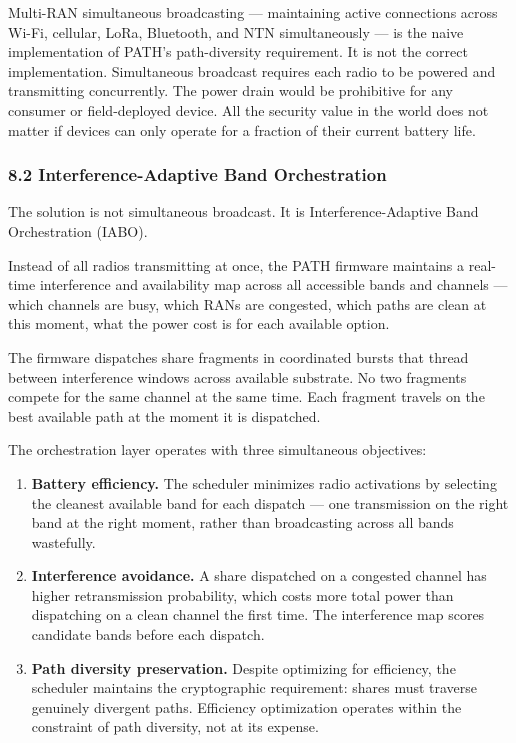 \documentclass[
  11pt,
]{article}
\providecommand{\tightlist}{%
  \setlength{\itemsep}{0pt}\setlength{\parskip}{0pt}}
\begin{document}
Multi-RAN simultaneous broadcasting --- maintaining active connections
across Wi-Fi, cellular, LoRa, Bluetooth, and NTN simultaneously --- is
the naive implementation of PATH's path-diversity requirement. It is not
the correct implementation. Simultaneous broadcast requires each radio
to be powered and transmitting concurrently. The power drain would be
prohibitive for any consumer or field-deployed device. All the security
value in the world does not matter if devices can only operate for a
fraction of their current battery life.

\hypertarget{interference-adaptive-band-orchestration-1}{%
\subsubsection{8.2 Interference-Adaptive Band
Orchestration}\label{interference-adaptive-band-orchestration-1}}

The solution is not simultaneous broadcast. It is Interference-Adaptive
Band Orchestration (IABO).

Instead of all radios transmitting at once, the PATH firmware maintains
a real-time interference and availability map across all accessible
bands and channels --- which channels are busy, which RANs are
congested, which paths are clean at this moment, what the power cost is
for each available option.

The firmware dispatches share fragments in coordinated bursts that
thread between interference windows across available substrate. No two
fragments compete for the same channel at the same time. Each fragment
travels on the best available path at the moment it is dispatched.

The orchestration layer operates with three simultaneous objectives:

\begin{enumerate}
\def\labelenumi{\arabic{enumi}.}
\tightlist
\item
  \textbf{Battery efficiency.} The scheduler minimizes radio activations
  by selecting the cleanest available band for each dispatch --- one
  transmission on the right band at the right moment, rather than
  broadcasting across all bands wastefully.
\item
  \textbf{Interference avoidance.} A share dispatched on a congested
  channel has higher retransmission probability, which costs more total
  power than dispatching on a clean channel the first time. The
  interference map scores candidate bands before each dispatch.
\item
  \textbf{Path diversity preservation.} Despite optimizing for
  efficiency, the scheduler maintains the cryptographic requirement:
  shares must traverse genuinely divergent paths. Efficiency
  optimization operates within the constraint of path diversity, not at
  its expense.
\end{enumerate}
\end{document}
